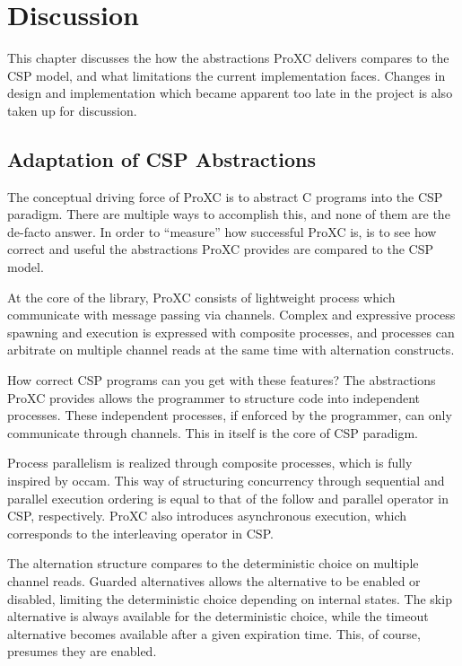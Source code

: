 
\chapter{Discussion}
\label{ch:discussion}

This chapter discusses the how the abstractions ProXC delivers compares to the CSP model, and what limitations the current implementation faces. Changes in design and implementation which became apparent too late in the project is also taken up for discussion. 

\section{Adaptation of CSP Abstractions}

The conceptual driving force of ProXC is to abstract C programs into the CSP paradigm. There are multiple ways to accomplish this, and none of them are the de\hyp{}facto answer. In order to ``measure'' how successful ProXC is, is to see how correct and useful the abstractions ProXC provides are compared to the CSP model. 

At the core of the library, ProXC consists of lightweight process which communicate with message passing via channels. Complex and expressive process spawning and execution is expressed with composite processes, and processes can arbitrate on multiple channel reads at the same time with alternation constructs. 

How correct CSP programs can you get with these features? The abstractions ProXC provides allows the programmer to structure code into independent processes. These independent processes, if enforced by the programmer, can only communicate through channels. This in itself is the core of CSP paradigm. 

Process parallelism is realized through composite processes, which is fully inspired by occam. This way of structuring concurrency through sequential and parallel execution ordering is equal to that of the follow and parallel operator in CSP, respectively. ProXC also introduces asynchronous execution, which corresponds to the interleaving operator in CSP. 

The alternation structure compares to the deterministic choice on multiple channel reads. Guarded alternatives allows the alternative to be enabled or disabled, limiting the deter\-mi\-nistic choice depending on internal states. The skip alternative is always available for the deter\-mi\-nistic choice, while the timeout alternative becomes available after a given expiration time. This, of course, presumes they are enabled. 

